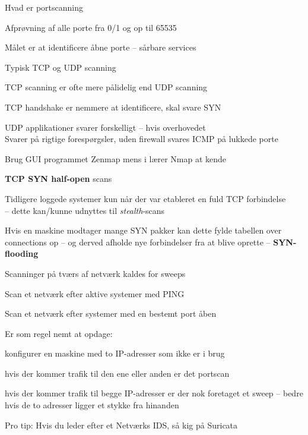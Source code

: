 \documentclass[Screen16to9,17pt]{foils}
\begin{document}

\begin{list1}
\item Hvad er portscanning
\item Afprøvning af alle porte fra 0/1 og op til 65535
\item Målet er at identificere åbne porte -- sårbare services
\item Typisk TCP og UDP scanning
\item TCP scanning er ofte mere pålidelig end UDP scanning
\item TCP handshake er nemmere at identificere, skal svare SYN
\item UDP applikationer svarer forskelligt -- hvis overhovedet\\
Svarer på rigtige forespørgsler, uden firewall svares ICMP på lukkede porte
\item Brug GUI programmet Zenmap mens i lærer Nmap at kende
\end{list1}




\begin{list2}
\item {\bfseries TCP SYN half-open} scans
\item Tidligere loggede systemer kun når der var etableret en fuld TCP
  forbindelse\\
  -- dette kan/kunne udnyttes til \emph{stealth}-scans
\item Hvis en maskine modtager mange SYN pakker kan dette fylde
  tabellen over connections op -- og derved afholde nye forbindelser
  fra at blive oprette -- {\bfseries SYN-flooding}
\end{list2}



\begin{list1}
\item Scanninger på tværs af netværk kaldes for sweeps
\item Scan et netværk efter aktive systemer med PING
\item Scan et netværk efter systemer med en bestemt port åben
\item Er som regel nemt at opdage:
  \begin{list2}
    \item konfigurer en maskine med to IP-adresser som ikke er i brug
\item hvis der kommer trafik til den ene eller anden er det portscan
\item hvis der kommer trafik til begge IP-adresser er der nok
  foretaget et sweep -- bedre hvis de to adresser ligger et stykke fra hinanden
  \end{list2}

\vskip 2cm
Pro tip: Hvis du leder efter et Netværks IDS, så kig på Suricata 
\end{list1}
\end{document}
